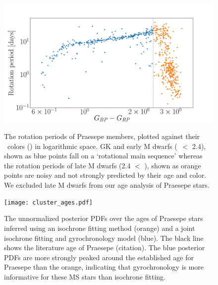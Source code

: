 
\begin{figure}
  \caption{
    The rotation periods of Praesepe members, plotted against
    their \Gaia\ colors (\gcolor) in logarithmic space.
    GK and early M dwarfs (\gcolor\ $<$ 2.4), shown as blue points fall on a
    `rotational main sequence' whereas the rotation periods of late M dwarfs
    (2.4 $<$ \gcolor), shown as orange points
    are noisy and not strongly predicted by their age and color.
    We excluded late M dwarfs from our age analysis of Praesepe stars.
}
  \centering
    \includegraphics[width=1\textwidth]{praesepe.pdf}
\label{fig:praesepe}
\end{figure}

\begin{figure}
  \caption{
    The unnormalized posterior PDFs over the ages of Praesepe stars inferred
    using an isochrone fitting method (orange) and a joint isochrone fitting
    and gyrochronology model (blue).
    The black line shows the literature age of Praesepe (citation).
    The blue posterior PDFs are more strongly peaked around the established
    age for Praesepe than the orange, indicating that gyrochronology is more
    informative for these MS stars than isochrone fitting.
}
  \centering
    \texttt{[image: cluster\_ages.pdf]}
\label{fig:ages}
\end{figure}


